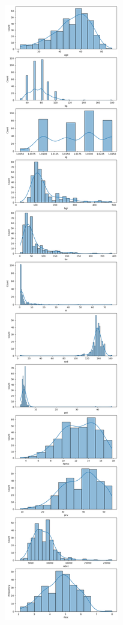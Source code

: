\documentclass[
  11pt,
  letterpaper,
  DIV=11,
  numbers=noendperiod]{scrartcl}
\begin{document}
\includegraphics{Assignment6_Final version_files/figure-pdf/cell-14-output-1.png}
\end{document}
